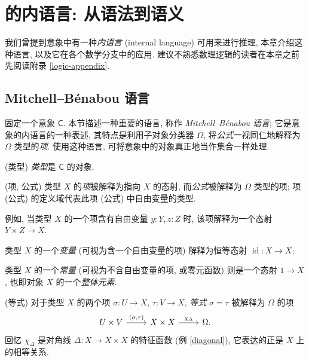 \chapter{\topos{}的内语言: 从语法到语义}


我们曾提到意象中有一种\emph{内语言} (internal language) 可用来进行推理, 本章介绍这种语言, 以及它在各个数学分支中的应用.
建议不熟悉数理逻辑的读者在本章之前先阅读附录 \ref{logic-appendix}.

\section{Mitchell--B\'enabou 语言}

固定一个意象 $\mathsf C$. 本节描述一种重要的语言, 称作 \emph{Mitchell--B\'enabou 语言}; 它是意象的内语言的一种表述, 其特点是利用子对象分类器 $\Omega$, 将\emph{公式}一视同仁地解释为 $\Omega$ 类型的\emph{项}. 使用这种语言, 可将意象中的对象真正地当作集合一样处理.

\begin{definition}
    {(类型)}
    \emph{类型}是 $\mathsf C$ 的对象.
\end{definition}

\begin{definition}
    {(项, 公式)}
    类型 $X$ 的\emph{项}被解释为指向 $X$ 的态射, 而\emph{公式}被解释为 $\Omega$ 类型的项;
    项 (公式) 的定义域代表此项 (公式) 中自由变量的类型.
    
    例如, 当类型 $X$ 的一个项含有自由变量 $y\colon Y, z\colon Z$ 时, 该项解释为一个态射 $Y\times Z \to X$.
    
    类型 $X$ 的一个\emph{变量} (可视为含一个自由变量的项) 解释为恒等态射 $\operatorname{id}\colon X \to X$;
    
    类型 $X$ 的一个\emph{常量} (可视为不含自由变量的项, 或零元函数) 则是一个态射 $1 \to X$, 也即对象 $X$ 的一个\emph{整体元素}.
\end{definition}

\begin{definition}
	{(等式)}
	对于类型 $X$ 的两个项 $\sigma\colon U \to X$, $\tau\colon V \to X$, \emph{等式} $\sigma = \tau$ 被解释为 $\Omega$ 的项
	\[\begin{tikzcd}[ampersand replacement=\&]
		{U\times V} \& {X\times X} \& \Omega.
		\arrow["{(\sigma,\tau)}", from=1-1, to=1-2]
		\arrow["{\chi_{\Delta}}", from=1-2, to=1-3]
	\end{tikzcd}\]
	回忆 $\chi_{\Delta}$ 是对角线 $\Delta\colon X\to X\times X$ 的特征函数 (例 \ref{diagonal}), 它表达的正是 $X$ 上的相等关系.
\end{definition}

